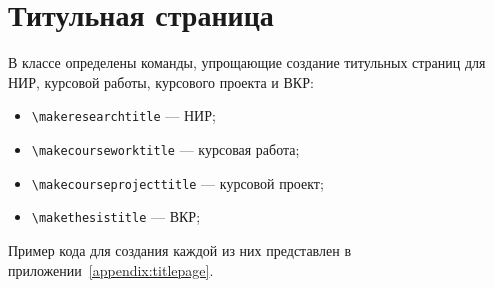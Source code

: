 \section{Титульная страница}

В классе определены команды, упрощающие создание титульных страниц для НИР,
курсовой работы, курсового проекта и ВКР:
\begin{itemize}
    \item \lstinline:\makeresearchtitle: --- НИР;
    \item \lstinline:\makecourseworktitle: --- курсовая работа;
    \item \lstinline:\makecourseprojecttitle: --- курсовой проект;
    \item \lstinline:\makethesistitle: --- ВКР;
\end{itemize}

Пример кода для создания каждой из них представлен в
приложении~\ref{appendix:titlepage}.

